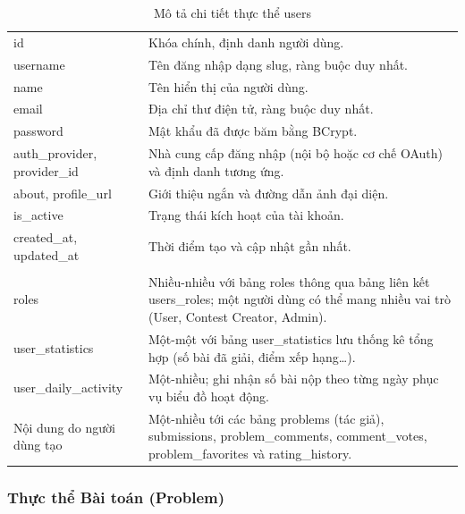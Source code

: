 \documentclass[12pt, a4paper]{report}
\begin{document}
\begin{longtable}{|>{\raggedright\arraybackslash}p{3.6cm}|>{\raggedright\arraybackslash}p{8.3cm}|}
  \caption{Mô tả chi tiết thực thể users}\label{tab:erd-users} \\
  \hline
  \endfirsthead
  \hline
  \endhead
  \hline
  \endfoot
  \endlastfoot
  \multicolumn{2}{|l|}{\textbf{Thuộc tính}} \\
  \hline
  id & Khóa chính, định danh người dùng. \\
  \hline
  username & Tên đăng nhập dạng slug, ràng buộc duy nhất. \\
  \hline
  name & Tên hiển thị của người dùng. \\
  \hline
  email & Địa chỉ thư điện tử, ràng buộc duy nhất. \\
  \hline
  password & Mật khẩu đã được băm bằng BCrypt. \\
  \hline
  auth\_provider, provider\_id & Nhà cung cấp đăng nhập (nội bộ hoặc cơ chế OAuth) và định danh tương ứng. \\
  \hline
  about, profile\_url & Giới thiệu ngắn và đường dẫn ảnh đại diện. \\
  \hline
  is\_active & Trạng thái kích hoạt của tài khoản. \\
  \hline
  created\_at, updated\_at & Thời điểm tạo và cập nhật gần nhất. \\
  \hline
  \multicolumn{2}{|l|}{\textbf{Quan hệ}} \\
  \hline
  roles & Nhiều-nhiều với bảng roles thông qua bảng liên kết
    users\_roles; một người dùng có thể mang nhiều vai trò (User, Contest Creator,
    Admin). \\
  \hline
  user\_statistics & Một-một với bảng user\_statistics lưu thống kê tổng
    hợp (số bài đã giải, điểm xếp hạng\dots). \\
  \hline
  user\_daily\_activity & Một-nhiều; ghi nhận số bài nộp theo từng ngày phục vụ
    biểu đồ hoạt động. \\
  \hline
  Nội dung do người dùng tạo & Một-nhiều tới các bảng problems (tác giả),
    submissions, problem\_comments, comment\_votes,
    problem\_favorites và rating\_history. \\
  \hline
\end{longtable}

\subsubsection{Thực thể Bài toán (Problem)}
\end{document}

